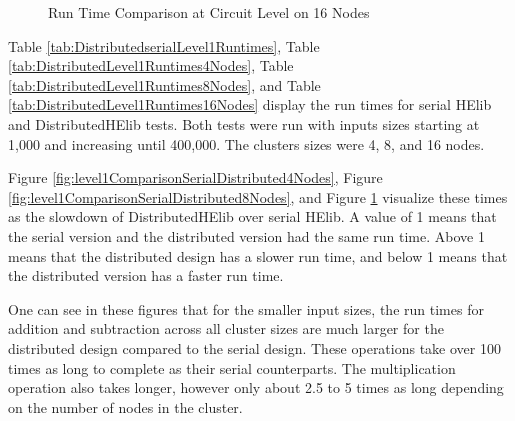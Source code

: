 \begin{figure}[p]
\centering


\caption{Run Time Comparison at Circuit Level on 16 Nodes}
\label{fig:level1ComparisonSerialDistributed16Nodes}
\end{figure}

Table \ref{tab:DistributedserialLevel1Runtimes}, Table \ref{tab:DistributedLevel1Runtimes4Nodes}, Table \ref{tab:DistributedLevel1Runtimes8Nodes}, and Table \ref{tab:DistributedLevel1Runtimes16Nodes} display the run times for serial HElib and DistributedHElib tests. Both tests were run with inputs sizes starting at 1,000 and increasing until 400,000. The clusters sizes were 4, 8, and 16 nodes.

Figure \ref{fig:level1ComparisonSerialDistributed4Nodes}, Figure \ref{fig:level1ComparisonSerialDistributed8Nodes}, and Figure \ref{fig:level1ComparisonSerialDistributed16Nodes} visualize these times as the slowdown of DistributedHElib over serial HElib. A value of 1 means that the serial version and the distributed version had the same run time. Above 1 means that the distributed design has a slower run time, and below 1 means that the distributed version has a faster run time.

One can see in these figures that for the smaller input sizes, the run times for addition and subtraction across all cluster sizes are much larger for the distributed design compared to the serial design. These operations take over 100 times as long to complete as their serial counterparts. The multiplication operation also takes longer, however only about 2.5 to 5 times as long depending on the number of nodes in the cluster. 

